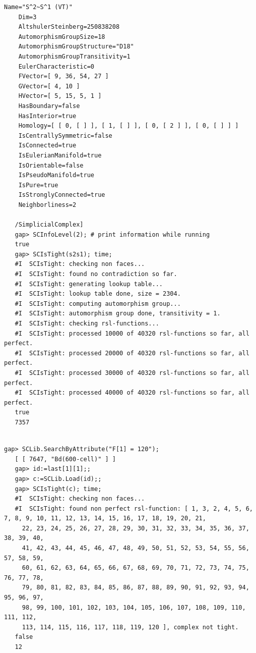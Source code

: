 \documentclass[a4paper,11pt]{report}
\begin{document}
{{{\begin{Verbatim}[commandchars=!@|,fontsize=\small,frame=single,label=Example]
    Name="S^2~S^1 (VT)"
    Dim=3
    AltshulerSteinberg=250838208
    AutomorphismGroupSize=18
    AutomorphismGroupStructure="D18"
    AutomorphismGroupTransitivity=1
    EulerCharacteristic=0
    FVector=[ 9, 36, 54, 27 ]
    GVector=[ 4, 10 ]
    HVector=[ 5, 15, 5, 1 ]
    HasBoundary=false
    HasInterior=true
    Homology=[ [ 0, [ ] ], [ 1, [ ] ], [ 0, [ 2 ] ], [ 0, [ ] ] ]
    IsCentrallySymmetric=false
    IsConnected=true
    IsEulerianManifold=true
    IsOrientable=false
    IsPseudoManifold=true
    IsPure=true
    IsStronglyConnected=true
    Neighborliness=2
   
   /SimplicialComplex]
   gap> SCInfoLevel(2); # print information while running
   true
   gap> SCIsTight(s2s1); time;
   #I  SCIsTight: checking non faces...
   #I  SCIsTight: found no contradiction so far.
   #I  SCIsTight: generating lookup table...
   #I  SCIsTight: lookup table done, size = 2304.
   #I  SCIsTight: computing automorphism group...
   #I  SCIsTight: automorphism group done, transitivity = 1.
   #I  SCIsTight: checking rsl-functions...
   #I  SCIsTight: processed 10000 of 40320 rsl-functions so far, all perfect.
   #I  SCIsTight: processed 20000 of 40320 rsl-functions so far, all perfect.
   #I  SCIsTight: processed 30000 of 40320 rsl-functions so far, all perfect.
   #I  SCIsTight: processed 40000 of 40320 rsl-functions so far, all perfect.
   true
   7357
   
\end{Verbatim}
 
\begin{Verbatim}[commandchars=!@|,fontsize=\small,frame=single,label=Example]
   gap> SCLib.SearchByAttribute("F[1] = 120");
   [ [ 7647, "Bd(600-cell)" ] ]
   gap> id:=last[1][1];;
   gap> c:=SCLib.Load(id);;
   gap> SCIsTight(c); time;
   #I  SCIsTight: checking non faces...
   #I  SCIsTight: found non perfect rsl-function: [ 1, 3, 2, 4, 5, 6, 7, 8, 9, 10, 11, 12, 13, 14, 15, 16, 17, 18, 19, 20, 21, 
     22, 23, 24, 25, 26, 27, 28, 29, 30, 31, 32, 33, 34, 35, 36, 37, 38, 39, 40, 
     41, 42, 43, 44, 45, 46, 47, 48, 49, 50, 51, 52, 53, 54, 55, 56, 57, 58, 59, 
     60, 61, 62, 63, 64, 65, 66, 67, 68, 69, 70, 71, 72, 73, 74, 75, 76, 77, 78, 
     79, 80, 81, 82, 83, 84, 85, 86, 87, 88, 89, 90, 91, 92, 93, 94, 95, 96, 97, 
     98, 99, 100, 101, 102, 103, 104, 105, 106, 107, 108, 109, 110, 111, 112, 
     113, 114, 115, 116, 117, 118, 119, 120 ], complex not tight.
   false
   12
   
\end{Verbatim}
 
}}}
\end{document}
